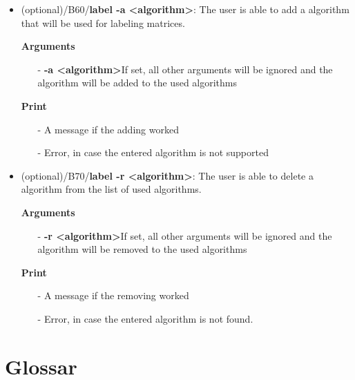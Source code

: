 \documentclass[parskip=full]{scrartcl}
\begin{document}
\begin{itemize}
\textbf{Arguments}
	\begin{itemize}
	\item[-]\textbf{-l} (flag) If set, all other arguments will be ignored 
	\end{itemize}
\textbf{Print}
	\begin{itemize}
	\item[-]A list of all \glspl{algorithm} the \gls{labeling module} is able currently uses and is able to use
	\end{itemize}

\item(optional)/B60/\textbf{label -a <algorithm>}:
\newline The user is able to add a \gls{algorithm} that will be used for labeling matrices.

\textbf{Arguments}
	\begin{itemize}
	\item[-]\textbf{-a <algorithm>}If set, all other arguments will be ignored and the \gls{algorithm} will be added to the used algorithms
	\end{itemize}
\textbf{Print}
	\begin{itemize}
	\item[-]A message if the adding worked
	\item[-]Error, in case the entered \gls{algorithm} is not supported 
	\end{itemize}

\item(optional)/B70/\textbf{label -r <algorithm>}:
\newline The user is able to delete a \gls{algorithm} from the list of used algorithms.

\textbf{Arguments}
	\begin{itemize}
	\item[-]\textbf{-r <algorithm>}If set, all other arguments will be ignored and the \gls{algorithm} will be removed to the used algorithms
	\end{itemize}
\textbf{Print}
	\begin{itemize}
	\item[-]A message if the removing worked
	\item[-]Error, in case the entered \gls{algorithm} is not found. 
	\end{itemize}

\end{itemize}
\clearpage

\section{Glossar}

%
\printnoidxglossaries
\end{document}
